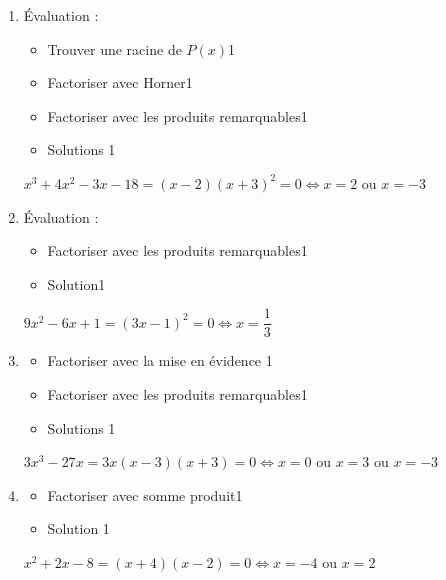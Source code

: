 %
%
    \begin{enumerate}
        \item Évaluation :
        \begin{itemize}
            \item Trouver une racine de $P(x)$\hfill 1
            \item Factoriser avec Horner\hfill 1
            \item Factoriser avec les produits remarquables\hfill 1
            \item Solutions \hfill 1
        \end{itemize}
        $x^{3}+4x^{2}-3x -18 = (x-2)(x+3)^2=0 \Leftrightarrow x = 2\text{~ou~} x= -3$

        \item Évaluation :
        \begin{itemize}
            \item Factoriser avec les produits remarquables\hfill 1
            \item Solution\hfill 1
        \end{itemize}
        $9x^2-6x+1 = (3x-1)^2 =0\Leftrightarrow x = \dfrac{1}{3}$

        \item
        \begin{itemize}
            \item Factoriser avec la mise en évidence \hfill 1
            \item Factoriser avec les produits remarquables\hfill 1
            \item Solutions \hfill 1
        \end{itemize}
        $3x^3-27x = 3x(x-3)(x+3)=0 \Leftrightarrow x=0 \text{~ou~}x=3\text{~ou~}x=-3$

        \item
        \begin{itemize}
            \item Factoriser avec somme produit\hfill 1
            \item Solution \hfill 1
        \end{itemize}
        $x^2+2x-8 = (x+4)(x-2) = 0\Leftrightarrow x=-4 \text{~ou~}x=2$
    \end{enumerate}
